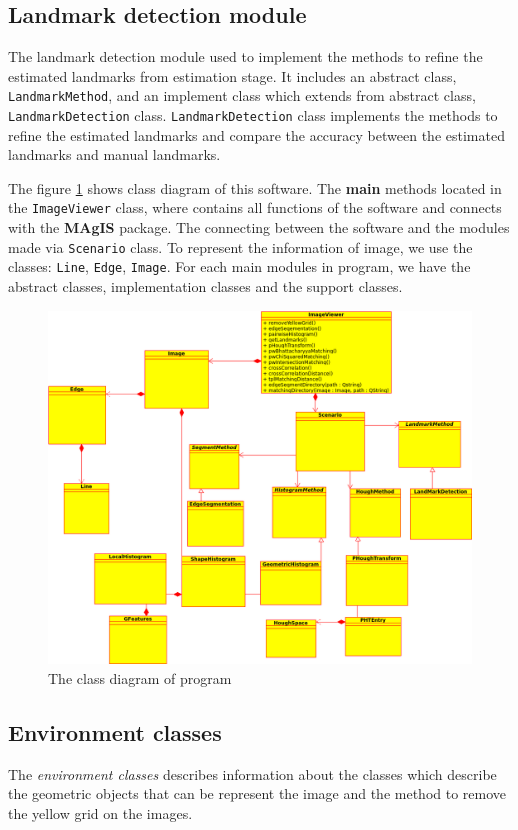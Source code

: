 \subsection{Landmark detection module}
The landmark detection module used to implement the methods to refine the estimated landmarks from estimation stage. It includes an abstract class, \texttt{LandmarkMethod}, and an implement class which extends from abstract class, \texttt{LandmarkDetection} class. \texttt{LandmarkDetection} class implements the methods to refine the estimated landmarks and compare the accuracy between the estimated landmarks and manual landmarks.

The figure \ref{fig:43} shows class diagram of this software. The \textbf{main} methods located in the \texttt{ImageViewer} class, where contains all functions of the software and connects with the \textbf{MAgIS} package. The connecting between the software and the modules made via \texttt{Scenario} class. To represent the information of image, we use the classes: \texttt{Line}, \texttt{Edge}, \texttt{Image}. For each main modules in program, we have the abstract classes, implementation classes and the support classes. \\
\begin{figure}[h!]
\centering
\includegraphics[width=1.1\textwidth]{./images/main}
\caption{The class diagram of program}
\label{fig:43}
\end{figure}
\subsection*{Environment classes}
The \textit{environment classes} describes information about the classes which describe the geometric objects that can be represent the image and the method to remove the yellow grid on the images.

